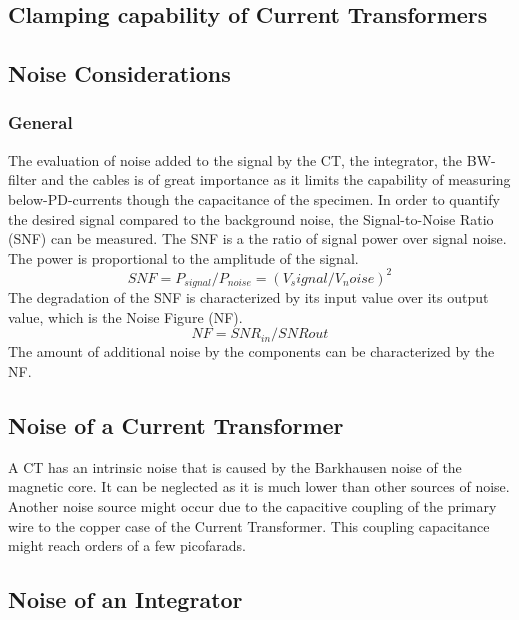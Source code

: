 \subsection{Clamping capability of Current Transformers }

\subsection{Noise Considerations}
\subsubsection{General}
The evaluation of noise added to the signal by the CT, the integrator, the BW-filter and the cables is of great importance as it limits the capability of measuring below-PD-currents though the capacitance of the specimen. 
In order to quantify the desired signal compared to the background noise, the Signal-to-Noise Ratio (SNF) can be measured. The SNF is a the ratio of signal power over signal noise. The power is proportional to the amplitude of the signal.
\begin{equation}
	SNF=P_{signal}/P_{noise} = (V_signal/V_noise)^2
\end{equation}
The degradation of the SNF is characterized by its input value over its output value, which is the Noise Figure (NF).
\begin{equation}
	NF = SNR_{in}/SNR{out}
\end{equation}
The amount of additional noise by the components can be characterized by the NF. 
\subsection{Noise of a Current Transformer}
A CT has an intrinsic noise that is caused by the Barkhausen noise of the magnetic core. It can be neglected as it is much lower than other sources of noise. %
Another noise source might occur due to the capacitive coupling of the primary wire to the copper case of the Current Transformer. This coupling capacitance might reach orders of a few picofarads. %


\subsection{Noise of an Integrator}


